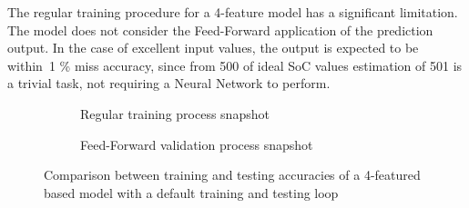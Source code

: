 The regular training procedure for a 4-feature model has a significant limitation. The model does not consider the Feed-Forward application of the prediction output.
In the case of excellent input values, the output is expected to be within~1 \% miss accuracy, since from 500 of ideal SoC values estimation of 501 is a trivial task, not requiring a Neural Network to perform.
 {
    \begin{figure}[htbp]
        \centering
        \begin{subfigure}[b]{\columnwidth}
            \centering
            
            \caption{Regular training process snapshot}
            \label{subfig:regular_tr}
        \end{subfigure}
        \hfill
        \begin{subfigure}[b]{\columnwidth}
            \centering
            
            \caption{Feed-Forward validation process snapshot}
            \label{subfig:regular_ts}
        \end{subfigure}
        \caption{Comparison between training and testing accuracies of a 4-featured based model with a default training and testing loop}
        \label{fig:regular_tr}
    \end{figure}

}

